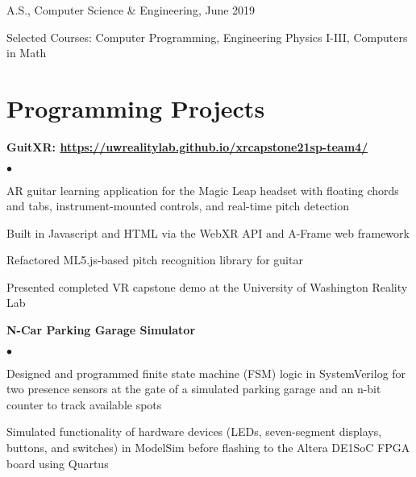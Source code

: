 \documentclass[margin,line]{res}
\newenvironment{list1}{
  \begin{list}{\ding{113}}{%
      \setlength{\itemsep}{0in}
      \setlength{\parsep}{0in} \setlength{\parskip}{0in}
      \setlength{\topsep}{0in} \setlength{\partopsep}{0in} 
      \setlength{\leftmargin}{0.17in}}}{\end{list}}
\newenvironment{list2}{
  \begin{list}{$\bullet$}{%
      \setlength{\itemsep}{0in}
      \setlength{\parsep}{0in} \setlength{\parskip}{0in}
      \setlength{\topsep}{0in} \setlength{\partopsep}{0in} 
      \setlength{\leftmargin}{0.2in}}}{\end{list}}
\begin{document}
\begin{resume}
\begin{list1}
\item[] A.S., Computer Science \& Engineering, June 2019
\item[] Selected Courses: Computer Programming, Engineering Physics I-III, Computers in Math
\end{list1}

\section{\sc Programming Projects}


{\bf GuitXR: \url{https://uwrealitylab.github.io/xrcapstone21sp-team4/}} %
\begin{list2}
\item AR guitar learning application for the Magic Leap headset with floating chords and tabs, instrument-mounted controls, and real-time pitch detection
\item Built in Javascript and HTML via the WebXR API and A-Frame web framework
\item Refactored ML5.js-based pitch recognition library for guitar 
\item Presented completed VR capstone demo at the University of Washington Reality Lab
\end{list2}

{\bf N-Car Parking Garage Simulator}
\begin{list2}
\item Designed and programmed finite state machine (FSM) logic in SystemVerilog for two presence sensors at the gate of a simulated parking garage and an n-bit counter to track available spots
\item Simulated functionality of hardware devices (LEDs, seven-segment displays, buttons, and switches) in ModelSim before flashing to the Altera DE1{\textunderscore}SoC FPGA board using Quartus
\end{list2}



\end{resume}
\end{document}

